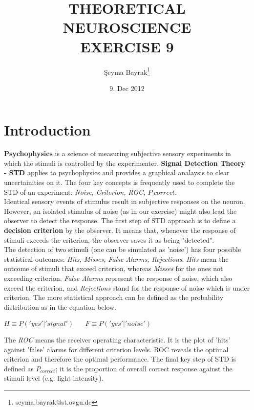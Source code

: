 \documentclass{article}
\begin{document}
\title{THEORETICAL NEUROSCIENCE \\ EXERCISE 9}
\date{9. Dec 2012}
\author[1]{\c{S}eyma Bayrak\thanks{seyma.bayrak@st.ovgu.de}}
\maketitle

\section{Introduction}
\textbf{Psychophysics} is a science of measuring subjective sensory experiments in which the stimuli is controlled by the experimenter. \textbf{Signal Detection Theory - STD} applies to psychophysics and provides a graphical analaysis to clear uncertainities on it. The four key concepts is frequently used to complete the STD of an experiment: \textit{Noise, Criterion, ROC, $P_.{correct}$}.\\

Identical sensory events of stimulus result in subjective responses on the neuron. However, an isolated stimulus of noise (as in our exercise) might also lead the observer to detect the response. The first step of STD approach is to define a \textbf{decision criterion} by the observer. It means that, whenever the response of stimuli exceeds the criterion, the observer saves it as being "detected".\\

The detection of two stimuli (one can be simulated as 'noise') has four possible statistical outcomes: \textit{Hits, Misses, False Alarms, Rejections}. \textit{Hits} mean the outcome of stimuli that exceed criterion, whereas \textit{Misses} for the ones not exceeding criterion. \textit{False Alarms} represent the response of noise, which also exceed the criterion, and \textit{Rejections} stand for the response of noise which is under criterion. The more statistical approach can be defined as the probability distribution as in the equation below.\\

\begin{center}
$H \equiv P('yes'|'signal') \,\,\,\,\,\,\,\,\,\, F \equiv P('yes'|'noise')$ 
\end{center}  

The \textit{ROC} means the receiver operating characteristic. It is the plot of 'hits' against 'false' alarms for different criterion levels. ROC reveals the optimal criterion and therefore the optimal performance. The final key step of STD is defined as $P_{correct}$; it is the proportion of overall correct response against the stimuli level (e.g. light intensity). \\
\end{document}
